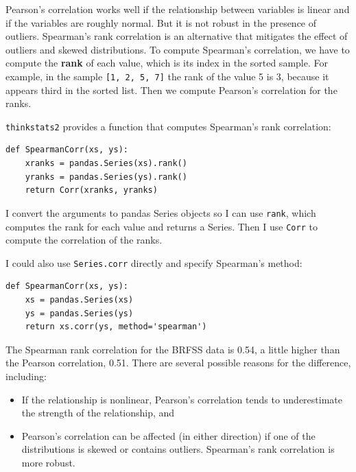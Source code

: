\documentclass[12pt]{book}
\begin{document}
Pearson's correlation works well if the relationship between variables
is linear and if the variables are roughly normal.  But it is not
robust in the presence of outliers.
Spearman's rank correlation is an alternative that mitigates the
effect of outliers and skewed distributions.  To compute Spearman's
correlation, we have to compute the {\bf rank} of each value, which is its
index in the sorted sample.  For example, in the sample {\tt [1, 2, 5, 7]}
the rank of the value 5 is 3, because it appears third in the sorted
list.  Then we compute Pearson's correlation for the ranks.

{\tt thinkstats2} provides a function that computes Spearman's rank
correlation:

\begin{verbatim}
def SpearmanCorr(xs, ys):
    xranks = pandas.Series(xs).rank()
    yranks = pandas.Series(ys).rank()
    return Corr(xranks, yranks)
\end{verbatim}

I convert the arguments to pandas Series objects so I can use
{\tt rank}, which computes the rank for each value and returns
a Series.  Then I use {\tt Corr} to compute the correlation
of the ranks.

I could also use {\tt Series.corr} directly and specify
Spearman's method:

\begin{verbatim}
def SpearmanCorr(xs, ys):
    xs = pandas.Series(xs)
    ys = pandas.Series(ys)
    return xs.corr(ys, method='spearman')
\end{verbatim}

The Spearman rank correlation for the BRFSS data is 0.54, a little
higher than the Pearson correlation, 0.51.  There are several possible
reasons for the difference, including:

\begin{itemize}

\item If the relationship is
nonlinear, Pearson's correlation tends to underestimate the strength
of the relationship, and 

\item Pearson's correlation can be affected (in either direction)
if one of the distributions is skewed or contains outliers.  Spearman's
rank correlation is more robust.

\end{itemize}
\end{document}
